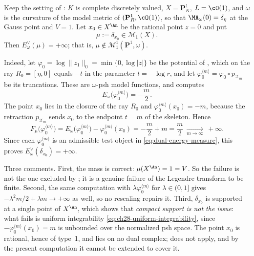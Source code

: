 \begin{example}
\label{ex:ch28-infinite-dual-energy}
Keep the setting of : \(K\) is complete
discretely valued, \(X=\mathbf P^1_K\), \(L=\cO(1)\), and \(\omega\) is the
curvature of the model metric of \((\mathbf P^1_R,\cO(1))\), so that
\(\MA_\omega(0)=\delta_\eta\) at the Gauss point and \(V=1\).  Let
\(x_0\in X^{\An}\) be the rational point \(z=0\) and put
\[
 \mu:=\delta_{x_0}\in\mathcal M_1(X).
\]
Then \(E^\vee_\omega(\mu)=+\infty\); that is,
\(\mu\notin\mathcal M^1_1(\mathbf P^1,\omega)\).

Indeed, let \(\varphi_0=\log\lVert z_1\rVert_0=\min\{0,\log|z|\}\) be the
potential of , which on the ray
\(R_0=[\eta,0]\) equals \(-t\) in the parameter \(t=-\log r\), and let
\(\varphi_0^{\langle m\rangle}=\varphi_0\circ p_{\mathcal X_m}\) be its
truncations.  These are \(\omega\)-psh model functions, and
 computes
\[
 E_\omega\bigl(\varphi_0^{\langle m\rangle}\bigr)=-\frac m2 .
\]
The point \(x_0\) lies in the closure of the ray \(R_0\) and
\(\varphi_0^{\langle m\rangle}(x_0)=-m\), because the retraction
\(p_{\mathcal X_m}\) sends \(x_0\) to the endpoint \(t=m\) of the skeleton.
Hence
\[
 F_\mu\bigl(\varphi_0^{\langle m\rangle}\bigr)
 =E_\omega\bigl(\varphi_0^{\langle m\rangle}\bigr)
  -\varphi_0^{\langle m\rangle}(x_0)
 =-\frac m2+m=\frac m2
 \ \xrightarrow[m\to\infty]{}\ +\infty .
\]
Since each \(\varphi_0^{\langle m\rangle}\) is an admissible test object in
\eqref{eq:dual-energy-measure}, this proves
\(E^\vee_\omega(\delta_{x_0})=+\infty\).

Three comments.  First, the mass is correct: \(\mu(X^{\An})=1=V\).  So the
failure is not the one excluded by ; it is a
genuine failure of the Legendre transform to be finite.  Second, the same
computation with \(\lambda\varphi_0^{\langle m\rangle}\) for
\(\lambda\in(0,1]\) gives \(-\lambda^2m/2+\lambda m\to+\infty\) as well, so
no rescaling repairs it.  Third, \(\delta_{x_0}\) is supported at a single
point of \(X^{\An}\), which shows that \emph{compact support is not the
issue}: what fails is uniform integrability
\eqref{eq:ch28-uniform-integrability}, since
\(-\varphi_0^{\langle m\rangle}(x_0)=m\) is unbounded over the normalized
psh space.  The point \(x_0\) is rational, hence of type~1, and lies on no
dual complex;  does not apply, and by the
present computation it cannot be extended to cover it.
\end{example}

